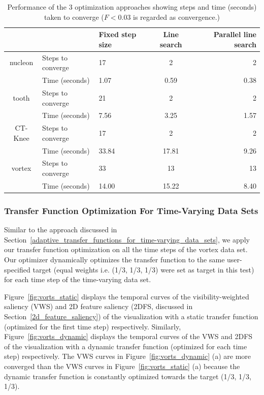 \begin{table}[h]
	\begin{tabular}{ c | l | l c r }
		& & Fixed step size & Line search & Parallel line search \\
		\hline
		nucleon & Steps to converge & 17 & 2 & 2 \\
		& Time (seconds) & 1.07 & 0.59 & 0.38 \\
		\hline
		tooth & Steps to converge & 21 & 2 & 2 \\
		& Time (seconds) & 7.56 & 3.25 & 1.57 \\
		\hline
		CT-Knee & Steps to converge & 17 & 2 & 2 \\
		& Time (seconds) & 33.84 & 17.81 & 9.26 \\
		\hline
		vortex & Steps to converge & 33 & 13 & 13 \\
		& Time (seconds) & 14.00 & 15.22 & 8.40 \\
	\end{tabular}
	\caption[Performance of the 3 optimization approaches]{Performance of the 3 optimization approaches showing steps and time (seconds) taken to converge ($ F<0.03 $ is regarded as convergence.)}
	\label{table:performance_table}
\end{table}


\subsubsection{Transfer Function Optimization For Time-Varying Data Sets}
Similar to the approach discussed in Section~\ref{adaptive_transfer_functions_for_time-varying_data_sets}, we apply our transfer function optimization on all the time steps of the vortex data set. Our optimizer dynamically optimizes the transfer function to the same user-specified target (equal weights i.e. (1/3, 1/3, 1/3) were set as target in this test) for each time step of the time-varying data set. 

Figure~\ref{fig:vorts_static} displays the temporal curves of the visibility-weighted saliency (VWS) and 2D feature saliency (2DFS, discussed in Section~\ref{2d_feature_saliency}) of the visualization with a static transfer function (optimized for the first time step) respectively.
Similarly, Figure~\ref{fig:vorts_dynamic} displays the temporal curves of the VWS and 2DFS of the visualization with a dynamic transfer function (optimized for each time step) respectively.
The VWS curves in Figure~\ref{fig:vorts_dynamic} (a) are more converged than the VWS curves in Figure~\ref{fig:vorts_static} (a) because the dynamic transfer function is constantly optimized towards the target (1/3, 1/3, 1/3).


